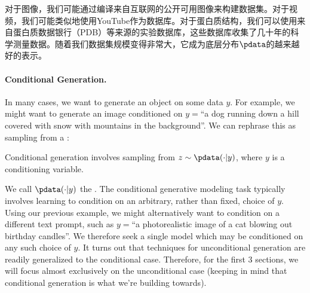 对于图像，我们可能通过编译来自互联网的公开可用图像来构建数据集。对于视频，我们可能类似地使用YouTube作为数据库。对于蛋白质结构，我们可以使用来自蛋白质数据银行（PDB）等来源的实验数据库，这些数据库收集了几十年的科学测量数据。随着我们数据集规模变得非常大，它成为底层分布$\pdata$的越来越好的表示。

\paragraph{Conditional Generation.} In many cases, we want to generate an object  on some data $y$. For example, we might want to generate an image conditioned on $y=$``a dog running down a hill covered with snow with mountains in the background''. We can rephrase this as sampling from a :
\begin{ideabox}
    Conditional generation involves sampling from $z\sim \pdata(\cdot | y)$, where $y$ is a conditioning variable.
\end{ideabox}
We call $\pdata(\cdot|y)$ the . The conditional generative modeling task typically involves learning to condition on an arbitrary, rather than fixed, choice of $y$. Using our previous example, we might alternatively want to condition on a different text prompt, such as $y=$``a photorealistic image of a cat blowing out birthday candles''. We therefore seek a single model which may be conditioned on any such choice of $y$. It turns out that techniques for unconditional generation are readily generalized to the conditional case. Therefore, for the first 3 sections, we will focus almost exclusively on the unconditional case (keeping in mind that conditional generation is what we're building towards).



